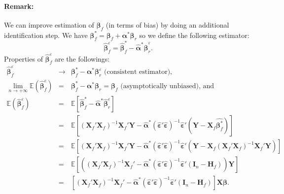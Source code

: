 \documentclass[12pt,a4paper]{report}
\begin{document}
\paragraph{Remark:}
		We can improve estimation of $\boldsymbol{\beta}_f$ (in terms of bias) by doing an additional identification step.	We have $\boldsymbol{\beta}^*_f=\boldsymbol{\beta}_f+\boldsymbol{\alpha}^*\boldsymbol{\beta}_r $ so we define the following estimator:
			\begin{equation}
			\hat{\boldsymbol{\beta}}_f^{\varepsilon}=\hat{\boldsymbol{\beta}}^*_f-\hat{\boldsymbol{\alpha}}^*\hat{\boldsymbol{\beta}}_{r}^{\varepsilon}. \nonumber 
			\end{equation}
Properties of $\hat{\boldsymbol{\beta}}_f^{\varepsilon}$ are the followings:
	\begin{eqnarray}
	\hat{\boldsymbol{\beta}}_f^{\varepsilon}& \longrightarrow & \boldsymbol{\beta}^*_f-\boldsymbol{\alpha}^*\boldsymbol{\beta}_{r}^{\varepsilon} \textrm{ (consistent estimator),}\nonumber\\
		\lim_{n \rightarrow +\infty}\mathbb{E}(\hat{\boldsymbol{\beta}}_f^{\varepsilon})&=&\boldsymbol{\beta}_f^*-\boldsymbol{\alpha}^*\boldsymbol{\beta}_r = \boldsymbol{\beta}_f \textrm{ (asymptotically unbiased), and} \nonumber \\
		\mathbb{E}(\hat{\boldsymbol{\beta}}_f^{\varepsilon})&=&\mathbb{E}[\hat{\boldsymbol{\beta}}^*_f-\hat{\boldsymbol{\alpha}}^*\hat{\boldsymbol{\beta}}_{r}^{\varepsilon}] \nonumber \\
		&=&\mathbb{E}[(\boldsymbol{X}_f'\boldsymbol{X}_f)^{-1}\boldsymbol{X}_f'\boldsymbol{Y}-\hat{\boldsymbol{\alpha}}^*(\hat{\boldsymbol{\varepsilon}}'\hat{\boldsymbol{\varepsilon}})^{-1}\hat{\boldsymbol{\varepsilon}}'(\boldsymbol{Y}- \boldsymbol{X}_f\hat{\boldsymbol{\beta}^*_f})]  \nonumber \\
		&=&\mathbb{E}[(\boldsymbol{X}_f'\boldsymbol{X}_f)^{-1}\boldsymbol{X}_f'\boldsymbol{Y}-\hat{\boldsymbol{\alpha}}^*(\hat{\boldsymbol{\varepsilon}}'\hat{\boldsymbol{\varepsilon}})^{-1}\hat{\boldsymbol{\varepsilon}}'(\boldsymbol{Y}- \boldsymbol{X}_f(\boldsymbol{X}_f'\boldsymbol{X}_f)^{-1}\boldsymbol{X}_f'\boldsymbol{Y})]  \nonumber \\
		&=&\mathbb{E}\left[\left((\boldsymbol{X}_f'\boldsymbol{X}_f)^{-1}\boldsymbol{X}_f'-\hat{\boldsymbol{\alpha}}^*(\hat{\boldsymbol{\varepsilon}}'\hat{\boldsymbol{\varepsilon}})^{-1}\hat{\boldsymbol{\varepsilon}}'(\boldsymbol{I}_n-\boldsymbol{H}_f)\right)\boldsymbol{Y}\right]  \nonumber \\
		&=&\left[(\boldsymbol{X}_f'\boldsymbol{X}_f)^{-1}\boldsymbol{X}_f'-\hat{\boldsymbol{\alpha}}^*(\hat{\boldsymbol{\varepsilon}}'\hat{\boldsymbol{\varepsilon}})^{-1}\hat{\boldsymbol{\varepsilon}}'(\boldsymbol{I}_n-\boldsymbol{H}_f)\right]\boldsymbol{X}\boldsymbol{\beta}. \nonumber
			\end{eqnarray}
\end{document}
